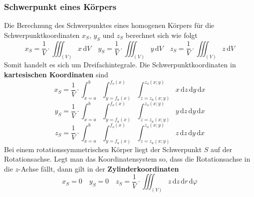\subsubsection{Schwerpunkt eines Körpers}
Die Berechnung des Schwerpunktes eines homogenen Körpers für die Schwerpunktkoordinaten $x_S$, $y_S$ und $z_S$ berechnet sich wie folgt
\begin{equation}
\boxed{x_S=\dfrac{1}{V}\cdot \displaystyle \iiint_{\left(V\right)}x\,\text{d}V}\quad \boxed{y_S=\dfrac{1}{V}\cdot \displaystyle \iiint_{\left(V\right)}y\,\text{d}V}\quad \boxed{z_S=\dfrac{1}{V}\cdot \displaystyle \iiint_{\left(V\right)}z\,\text{d}V}
\end{equation}
Somit handelt es sich um Dreifachintegrale. Die Schwerpunktkoordinaten in \textbf{kartesischen Koordinaten} sind
\begin{equation}
\boxed{x_S=\dfrac{1}{V}\cdot \displaystyle \int_{x=a}^{b}\displaystyle \int_{y=f_u\left(x\right)}^{f_o\left(x\right)}\displaystyle \int_{z=z_u\left(x; y\right)}^{z_o\left(x;y\right)}x\,\text{d}z\,\text{d}y\,\text{d}x}
\end{equation}
\begin{equation}
\boxed{y_S=\dfrac{1}{V}\cdot \displaystyle \int_{x=a}^{b}\displaystyle \int_{y=f_u\left(x\right)}^{f_o\left(x\right)}\displaystyle \int_{z=z_u\left(x; y\right)}^{z_o\left(x;y\right)}y\,\text{d}z\,\text{d}y\,\text{d}x}
\end{equation}
\begin{equation}
\boxed{z_S=\dfrac{1}{V}\cdot \displaystyle \int_{x=a}^{b}\displaystyle \int_{y=f_u\left(x\right)}^{f_o\left(x\right)}\displaystyle \int_{z=z_u\left(x; y\right)}^{z_o\left(x;y\right)}z\,\text{d}z\,\text{d}y\,\text{d}x}
\end{equation}
Bei einem rotationssymmetrischen Körper liegt der Schwerpunkt $S$ auf der Rotationsachse. Legt man das Koordinatensystem so, dass die Rotationsachse in die $z$-Achse fällt, dann  gilt in der \textbf{Zylinderkoordinaten}
\begin{equation}
\boxed{x_S=0}\quad \boxed{y_S=0}\quad \boxed{z_S=\dfrac{1}{V}\cdot \displaystyle \iiint_{\left(V\right)}z\,\text{d}z\,\text{d}r\,\text{d}\varphi}
\end{equation}

